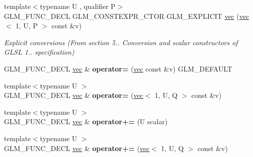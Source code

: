 \begin{DoxyCompactItemize}
{\footnotesize template$<$typename U , qualifier P$>$ }\\G\+L\+M\+\_\+\+F\+U\+N\+C\+\_\+\+D\+E\+CL G\+L\+M\+\_\+\+C\+O\+N\+S\+T\+E\+X\+P\+R\+\_\+\+C\+T\+OR G\+L\+M\+\_\+\+E\+X\+P\+L\+I\+C\+IT \hyperlink{structglm_1_1vec_3_011_00_01T_00_01Q_01_4_abd93e6bf42d506d85f4aea0c5d92ecc2}{vec} (\hyperlink{structglm_1_1vec}{vec}$<$ 1, U, P $>$ const \&v)
\begin{DoxyCompactList}\small\item\em Explicit conversions (From section 5.. Conversion and scalar constructors of G\+L\+SL 1.. specification) \end{DoxyCompactList}\item 
\mbox{\label{structglm_1_1vec_3_011_00_01T_00_01Q_01_4_a2b1587b896791453817ccd639ce413ab}} 
G\+L\+M\+\_\+\+F\+U\+N\+C\+\_\+\+D\+E\+CL \hyperlink{structglm_1_1vec}{vec} \& {\bfseries operator=} (\hyperlink{structglm_1_1vec}{vec} const \&v) G\+L\+M\+\_\+\+D\+E\+F\+A\+U\+LT
\item 
\mbox{\label{structglm_1_1vec_3_011_00_01T_00_01Q_01_4_a83bcded6663e3bba5491240ff8a984d7}} 
{\footnotesize template$<$typename U $>$ }\\G\+L\+M\+\_\+\+F\+U\+N\+C\+\_\+\+D\+E\+CL \hyperlink{structglm_1_1vec}{vec} \& {\bfseries operator=} (\hyperlink{structglm_1_1vec}{vec}$<$ 1, U, Q $>$ const \&v)
\item 
\mbox{\label{structglm_1_1vec_3_011_00_01T_00_01Q_01_4_acdec3852ebe81329d4c52d4cf5a15a9e}} 
{\footnotesize template$<$typename U $>$ }\\G\+L\+M\+\_\+\+F\+U\+N\+C\+\_\+\+D\+E\+CL \hyperlink{structglm_1_1vec}{vec} \& {\bfseries operator+=} (U scalar)
\item 
\mbox{\label{structglm_1_1vec_3_011_00_01T_00_01Q_01_4_a658d20bd2f3896cd459c5569fbc086ae}} 
{\footnotesize template$<$typename U $>$ }\\G\+L\+M\+\_\+\+F\+U\+N\+C\+\_\+\+D\+E\+CL \hyperlink{structglm_1_1vec}{vec} \& {\bfseries operator+=} (\hyperlink{structglm_1_1vec}{vec}$<$ 1, U, Q $>$ const \&v)
\item 
\mbox{\label{structglm_1_1vec_3_011_00_01T_00_01Q_01_4_aa5f48c43d3c71aacd712fedcdf05362f}} 

\end{DoxyCompactItemize}
